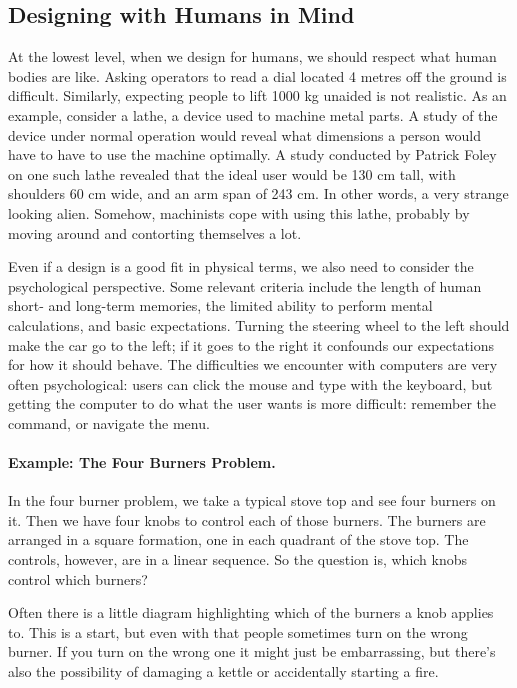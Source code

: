 \subsection*{Designing with Humans in Mind}
At the lowest level, when we design for humans, we should respect what human bodies are like. Asking operators to read a dial located 4 metres off the ground is difficult. Similarly, expecting people to lift 1000 kg unaided is not realistic. As an example, consider a lathe, a device used to machine metal parts. A study of the device under normal operation would reveal what dimensions a person would have to have to use the machine optimally. A study conducted by Patrick Foley on one such lathe revealed that the ideal user would be 130 cm tall, with shoulders 60 cm wide, and an arm span of 243 cm. In other words, a very strange looking alien. Somehow, machinists cope with using this lathe, probably by moving around and contorting themselves a lot. 

Even if a design is a good fit in physical terms, we also need to consider the psychological perspective. Some relevant criteria include the length of human short- and long-term memories, the limited ability to perform mental calculations, and basic expectations. Turning the steering wheel to the left should make the car go to the left; if it goes to the right it confounds our expectations for how it should behave. The difficulties we encounter with computers are very often psychological: users can click the mouse and type with the keyboard, but getting the computer to do what the user wants is more difficult: remember the command, or navigate the menu.

\paragraph{Example: The Four Burners Problem.}
In the four burner problem, we take a typical stove top and see four burners on it. Then we have four knobs to control each of those burners. The burners are arranged in a square formation, one in each quadrant of the stove top. The controls, however, are in a linear sequence. So the question is, which knobs control which burners?

Often there is a little diagram highlighting which of the burners a knob applies to. This is a start, but even with that people sometimes turn on the wrong burner. If you turn on the wrong one it might just be embarrassing, but there's also the possibility of damaging a kettle or accidentally starting a fire. 

